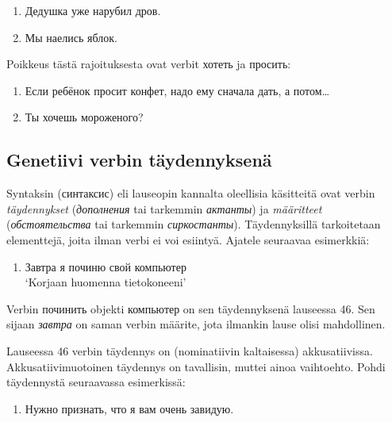 \documentclass[]{scrartcl}
\providecommand{\tightlist}{%
  \setlength{\itemsep}{0pt}\setlength{\parskip}{0pt}}
\begin{document}
\begin{enumerate}
\def\labelenumi{(\arabic{enumi})}
\setcounter{enumi}{41}
\tightlist
\item
  Дедушка уже нарубил дров.
\item
  Мы наелись яблок.
\end{enumerate}

Poikkeus tästä rajoituksesta ovat verbit хотеть ja просить:

\begin{enumerate}
\def\labelenumi{(\arabic{enumi})}
\setcounter{enumi}{43}
\tightlist
\item
  Если ребёнок просит конфет, надо ему сначала дать, а потом\ldots{}
\item
  Ты хочешь мороженого?
\end{enumerate}

\subsection{Genetiivi verbin
täydennyksenä}\label{genetiivi-verbin-tuxe4ydennyksenuxe4}

Syntaksin (синтаксис) eli lauseopin kannalta oleellisia käsitteitä ovat
verbin \emph{täydennykset} (\emph{дополнения} tai tarkemmin
\emph{актанты}) ja \emph{määritteet} (\emph{обстоятельства} tai
tarkemmin \emph{сиркостанты}). Täydennyksillä tarkoitetaan elementtejä,
joita ilman verbi ei voi esiintyä. Ajatele seuraavaa esimerkkiä:

\begin{enumerate}
\def\labelenumi{(\arabic{enumi})}
\setcounter{enumi}{45}
\tightlist
\item
  Завтра я починю свой компьютер\\
   `Korjaan huomenna tietokoneeni'
\end{enumerate}

Verbin починить objekti компьютер on sen täydennyksenä lauseessa 46. Sen
sijaan \emph{завтра} on saman verbin määrite, jota ilmankin lause olisi
mahdollinen.

Lauseessa 46 verbin täydennys on (nominatiivin kaltaisessa)
akkusatiivissa. Akkusatiivimuotoinen täydennys on tavallisin, muttei
ainoa vaihtoehto. Pohdi täydennystä seuraavassa esimerkissä:

\begin{enumerate}
\def\labelenumi{(\arabic{enumi})}
\setcounter{enumi}{46}
\tightlist
\item
  Нужно признать, что я вам очень завидую.
\end{enumerate}
\end{document}
